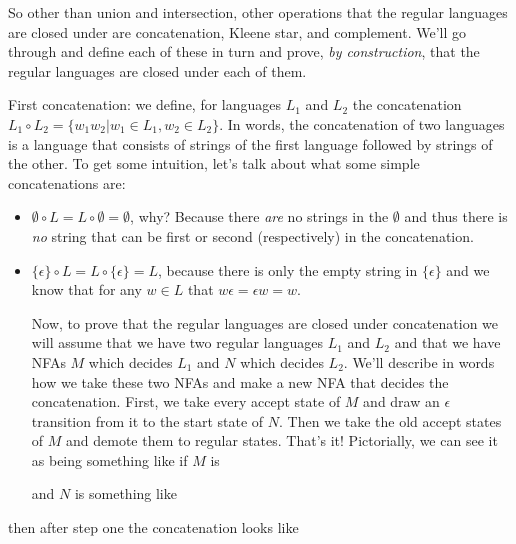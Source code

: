 \documentclass[11pt]{article}
\begin{document}
So other than union and intersection, other operations that the regular languages are closed under are concatenation, Kleene star, and complement. We'll go through and define each of these in turn and prove, \emph{by construction}, that the regular languages are closed under each of them.

First concatenation: we define, for languages $L_1$ and $L_2$ the concatenation $L_1 \circ L_2 = \{ w_1 w_2 | w_1 \in L_1, w_2 \in L_2\}$. In words, the concatenation of two languages is a language that consists of strings of the first language followed by strings of the other. To get some intuition, let's talk about what some simple concatenations are:
\begin{itemize}
\item $\emptyset \circ L = L \circ \emptyset = \emptyset$, why? Because there \emph{are} no strings in the $\emptyset$ and thus there is \emph{no} string that can be first or second (respectively) in the concatenation.
\item $\{ \epsilon \} \circ L = L \circ \{ \epsilon \} = L$, because there is only the empty string in $\{ \epsilon \}$ and we know that for any $w \in L$ that $w \epsilon = \epsilon w = w$.

Now, to prove that the regular languages are closed under concatenation we will assume that we have two regular languages $L_1$ and $L_2$ and that we have NFAs $M$ which decides $L_1$ and $N$ which decides $L_2$. We'll describe in words how we take these two NFAs and make a new NFA that decides the concatenation. First, we take every accept state of $M$ and draw an $\epsilon$ transition from it to the start state of $N$. Then we take the old accept states of $M$ and demote them to regular states. That's it! Pictorially, we can see it as being something like if $M$ is

and $N$ is something like
\end{itemize}

then after step one the concatenation looks like
\end{document}
